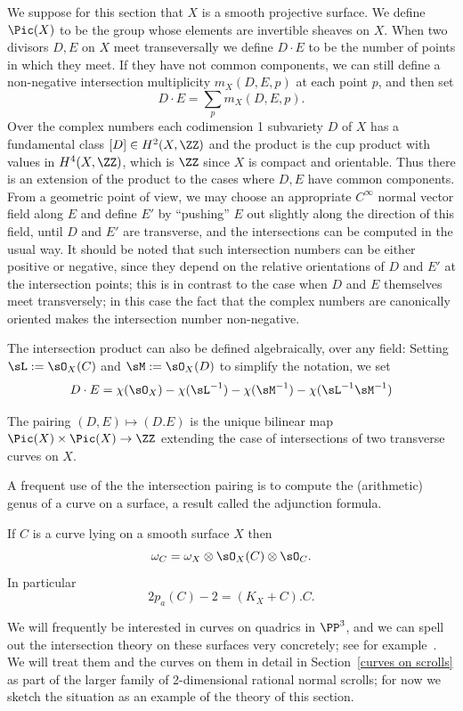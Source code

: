  We suppose for this section that $X$ is a smooth projective surface.
 We define $\Pic(X)$ to be the group whose elements are invertible sheaves on $X$.
When two divisors $D,E$ on $X$ meet transeversally we define $D\cdot E$ to be the number of points in which they meet. If they have not common
components, we can still define a non-negative intersection multiplicity $m_X(D,E,p)$ at each point $p$, and then set
$$
D\cdot E = \sum_p m_X(D,E,p).
$$
Over the complex numbers each codimension 1 subvariety $D$ of $X$ has a fundamental class
$[D]\in H^2(X, \ZZ)$ and the product is the cup product with values in $H^4(X,\ZZ)$, which is $\ZZ$ since $X$ is compact and orientable. Thus
there is an extension of the product to the cases where $D,E$ have common components. From a geometric point of view, we may choose an
appropriate $C^\infty$
normal vector field along $E$ and define $E'$ by ``pushing'' $E$ out slightly along the direction of this field, until $D$ and $E'$ are transverse,
and the intersections can be computed in the usual way. It should be noted that such intersection numbers can be either positive or negative,
since they depend on the relative orientations of $D$ and $E'$ at the intersection points; this is in contrast to the case when $D$ and $E$
themselves meet transversely; in this case the fact that the complex numbers are canonically oriented makes the intersection number non-negative.

The intersection product can also be defined algebraically, over any field: Setting $\sL := \sO_X(C)$ and
$\sM := \sO_X(D)$ to simplify the notation, we set 
$$
D\cdot E = \chi(\sO_X)-\chi(\sL^{-1}) -\chi(\sM^{-1}) -\chi(\sL^{-1}\sM^{-1}) 
$$
\begin{theorem} The pairing $(D,E) \mapsto (D.E)$ is the unique bilinear map
$\Pic(X) \times \Pic(X) \to \ZZ$ extending the case of intersections of two transverse curves on $X$. 
\end{theorem}

A frequent use of the the intersection pairing is to compute the (arithmetic) genus of a curve on a surface,
a result called the adjunction formula.

\begin{theorem}\label{adjuction formula}
If $C$ is a curve lying on a smooth surface $X$ then 
$$
\omega_C = \omega_X \otimes \sO_X(C) \otimes \sO_C.
$$
In particular 
$$
2p_a(C) -2 = (K_X+C).C.
 $$
\end{theorem}

We will frequently be interested in curves on quadrics in $\PP^3$, and we can spell out the
intersection theory on these surfaces very concretely; see for example~\cite[****]{Hartshorne1977}.
We will treat them and the curves on them in detail in Section~\ref{curves on scrolls} as part of the larger family of 2-dimensional rational normal scrolls; for
now we sketch the situation as an example of the theory of this section. 

